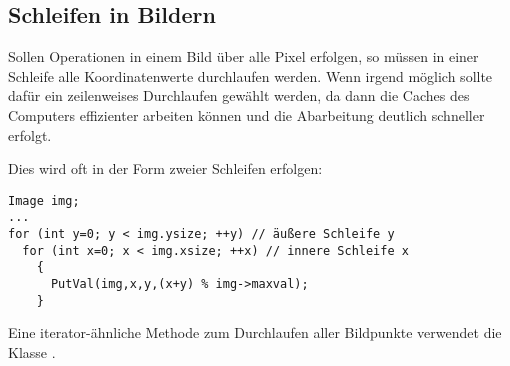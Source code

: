 

\subsection{Schleifen in Bildern}

Sollen Operationen in einem Bild über alle Pixel erfolgen, so müssen 
in einer Schleife alle Koordinatenwerte durchlaufen werden. 
Wenn irgend möglich sollte dafür ein zeilenweises Durchlaufen gewählt 
werden, da dann die Caches des Computers effizienter arbeiten können 
und die Abarbeitung deutlich schneller erfolgt. 

Dies wird oft in der Form zweier Schleifen erfolgen:

\begprogr
\begin{verbatim}
Image img;
... 
for (int y=0; y < img.ysize; ++y) // äußere Schleife y
  for (int x=0; x < img.xsize; ++x) // innere Schleife x
    {
      PutVal(img,x,y,(x+y) % img->maxval);
    }
\end{verbatim}
\endprogr

Eine iterator-ähnliche Methode zum Durchlaufen aller Bildpunkte
verwendet die Klasse .

